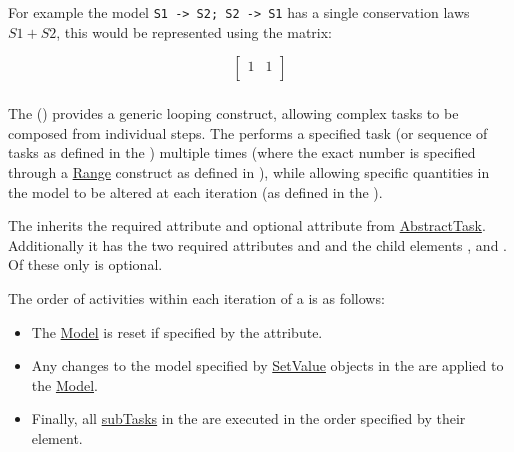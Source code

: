 For example the model {\tt S1 -> S2; S2 -> S1} has a single conservation laws $S1 + S2$, this would be represented using the matrix:

$$
\left[
\begin{array}{ll}
1 & 1 \\
\end{array}
\right]
$$

\subsubsection{}
\label{class:repeatedTask}
The  () provides a generic looping construct, allowing complex tasks to be composed from individual steps. The  performs a specified task (or sequence of tasks as defined in the \hyperref[sec:listOfSubTasks]{}) multiple times (where the exact number is specified through a \hyperref[class:range]{Range} construct as defined in \hyperref[sec:rangeAttribute]{}), while allowing specific quantities in the model to be altered at each iteration (as defined in the \hyperref[sec:changesRepeatedTask]{}).


The  inherits the required attribute \hyperref[sec:id]{} and optional attribute \hyperref[sec:name]{} from \hyperref[class:abstractTask]{AbstractTask}. Additionally it has the two required attributes \hyperref[sec:rangeAttribute]{} and \hyperref[sec:resetModel]{} and the child elements \hyperref[sec:listOfRanges]{}, \hyperref[sec:changesRepeatedTask]{} and \hyperref[class:subTask]{}. Of these \hyperref[sec:listOf]{} only \hyperref[sec:changesRepeatedTask]{} is optional.

The order of activities within each iteration of a  is as follows:
\begin{itemize} 
	\item The \hyperref[class:model]{Model} is reset if specified by the \hyperref[sec:resetModel]{} attribute. 
	\item Any changes to the model specified by \hyperref[class:setValue]{SetValue} objects in the \hyperref[sec:changesRepeatedTask]{} are applied to the \hyperref[class:model]{Model}. 
	\item Finally, all \hyperref[class:subTask]{{subTasks}} in the \hyperref[sec:listOfSubTasks]{} are executed in the order specified by their \hyperref[sec:subTaskOrder]{} element.
\end{itemize}

